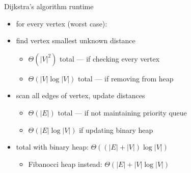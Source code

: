 \begin{frame}{Dijkstra's algorithm runtime}
\begin{itemize}
\item for every vertex (worst case):
\vspace{.5cm}
\item find vertex smallest unknown distance
    \begin{itemize}
    \item $\Theta(|V|^2)$ total --- if checking every vertex
    \item $\Theta(|V|\log|V|)$ total --- if removing from heap
    \end{itemize}
\item scan all edges of vertex, update distances
    \begin{itemize}
    \item $\Theta(|E|)$ total --- if not maintaining priority queue
    \item $\Theta(|E|\log|V|)$ if updating binary heap
    \end{itemize}
\vspace{.5cm}
\item total with binary heap: $\Theta((|E|+|V|)\log|V|)$
    \begin{itemize}
    \item Fibanocci heap instead: $\Theta(|E|+|V|\log|V|)$
    \end{itemize}
\end{itemize}
\end{frame}
